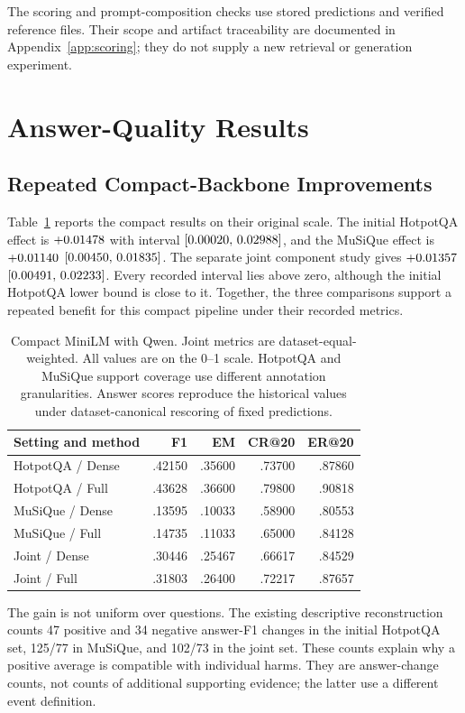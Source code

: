 \documentclass[11pt,a4paper]{article}
\begin{document}
The scoring and prompt-composition checks use stored predictions and verified
reference files. Their scope and artifact traceability are documented in
Appendix~\ref{app:scoring}; they do not supply a new retrieval or generation
experiment.

\section{Answer-Quality Results}
\subsection{Repeated Compact-Backbone Improvements}
Table~\ref{tab:compact} reports the compact results on their original scale.
The initial HotpotQA effect is $+0.01478$ with interval $[0.00020,\,0.02988]$,
and the MuSiQue effect is $+0.01140$ $[0.00450,\,0.01835]$.
The separate joint component study gives $+0.01357$ $[0.00491,\,0.02233]$.
Every recorded interval lies above zero, although the initial HotpotQA
lower bound is close to it. Together, the three comparisons support a
repeated benefit for this compact pipeline under their recorded metrics.

\begin{table}[t]
\centering\small
\begin{tabular}{@{}lrrrr@{}}
\toprule
Setting and method & F1 & EM & CR@20 & ER@20\\
\midrule
HotpotQA / Dense & .42150 & .35600 & .73700 & .87860\\
HotpotQA / Full & .43628 & .36600 & .79800 & .90818\\
MuSiQue / Dense & .13595 & .10033 & .58900 & .80553\\
MuSiQue / Full & .14735 & .11033 & .65000 & .84128\\
Joint / Dense & .30446 & .25467 & .66617 & .84529\\
Joint / Full & .31803 & .26400 & .72217 & .87657\\
\bottomrule
\end{tabular}
\caption{Compact MiniLM with Qwen. Joint metrics are dataset-equal-weighted.
All values are on the 0--1 scale. HotpotQA and MuSiQue support coverage use
different annotation granularities. Answer scores reproduce the historical
values under dataset-canonical rescoring of fixed predictions.}
\label{tab:compact}
\end{table}

The gain is not uniform over questions. The existing descriptive
reconstruction counts 47 positive and 34 negative answer-F1 changes in the
initial HotpotQA set, 125/77 in MuSiQue, and 102/73 in the joint set.
These counts explain why a positive average is compatible with individual
harms. They are answer-change counts, not counts of additional supporting
evidence; the latter use a different event definition.
\end{document}
